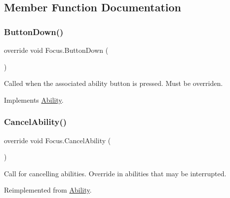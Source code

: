 \subsection{Member Function Documentation}
\hypertarget{class_focus_a607e4f36f1abef12e7a4966f95bc8616}{}\label{class_focus_a607e4f36f1abef12e7a4966f95bc8616} 
\subsubsection{\texorpdfstring{Button\+Down()}{ButtonDown()}}
{\footnotesize\ttfamily override void Focus.\+Button\+Down (\begin{DoxyParamCaption}{ }\end{DoxyParamCaption})\hspace{0.3cm}{\ttfamily [virtual]}}



Called when the associated ability button is pressed. Must be overriden. 



Implements \hyperlink{class_ability_a7722265862f8b29828315725415ce266}{Ability}.

\hypertarget{class_focus_ae3bec489a21cdf93bd302eaf01c86b4b}{}\label{class_focus_ae3bec489a21cdf93bd302eaf01c86b4b} 
\subsubsection{\texorpdfstring{Cancel\+Ability()}{CancelAbility()}}
{\footnotesize\ttfamily override void Focus.\+Cancel\+Ability (\begin{DoxyParamCaption}{ }\end{DoxyParamCaption})\hspace{0.3cm}{\ttfamily [virtual]}}



Call for cancelling abilities. Override in abilities that may be interrupted. 



Reimplemented from \hyperlink{class_ability_ab0eaf1ad670e0624a5534c50b10c002f}{Ability}.

\hypertarget{class_focus_a5f64f51f4074500f2572dea35eec1610}{}\label{class_focus_a5f64f51f4074500f2572dea35eec1610} 
